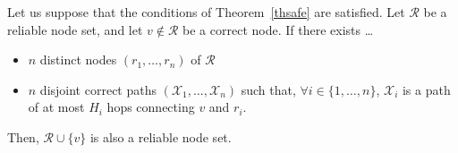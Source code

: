 \documentclass[a4paper,11pt]{article}
\begin{document}
\begin{theorem}

\label{threl}
Let us suppose that the conditions of Theorem~\ref{thsafe} are satisfied.
Let $\mathcal{R}$ be a reliable node set, and let $v \notin \mathcal{R}$ be a correct node. If there exists \dots
\begin{itemize}
\item $n$ distinct nodes $(r_1,\dots,r_n)$ of $\mathcal{R}$
\item $n$ disjoint correct paths $(\mathcal{X}_1,\dots,\mathcal{X}_n)$ such that, $\forall i \in \{1,\dots,n\}$, $\mathcal{X}_i$ is a path of at most $H_i$ hops connecting $v$ and $r_i$.
\end{itemize}
Then, $\mathcal{R} \cup \{v\}$ is also a reliable node set.
\end{theorem}
\end{document}
